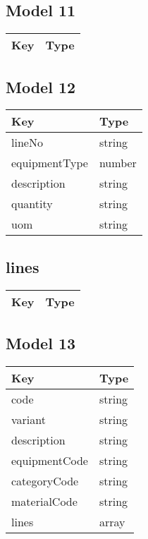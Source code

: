 \documentclass[10pt]{article}
\begin{document}
            \subsection{Model 11}
            
            \begin{tabularx}{\textwidth}{lZ}
                \textbf{Key} & \textbf{Type} \\
                \hline
            \end{tabularx}
            \subsection{Model 12}
            
            \begin{tabularx}{\textwidth}{lZ}
                \textbf{Key} & \textbf{Type} \\
                \hline
                    lineNo & string \\
                    equipmentType & number \\
                    description & string \\
                    quantity & string \\
                    uom & string \\
            \end{tabularx}
            \subsection{lines}
            
            \begin{tabularx}{\textwidth}{lZ}
                \textbf{Key} & \textbf{Type} \\
                \hline
            \end{tabularx}
            \subsection{Model 13}
            
            \begin{tabularx}{\textwidth}{lZ}
                \textbf{Key} & \textbf{Type} \\
                \hline
                    code & string \\
                    variant & string \\
                    description & string \\
                    equipmentCode & string \\
                    categoryCode & string \\
                    materialCode & string \\
                    lines & array \\
            \end{tabularx}
\end{document}
